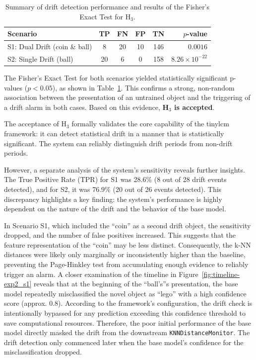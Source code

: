 \begin{table}[htbp]
    \centering
    \caption[Quantitative Drift Detection Results and Hypothesis Test for H$_3$]{Summary of drift detection performance and results of the Fisher's Exact Test for H$_3$.}
    \label{tab:drift_detection_combined_results}
    \footnotesize
    \setlength{\tabcolsep}{4pt}
    \begin{tabularx}{\linewidth}{@{} X c c c c r @{}}
        \toprule
        \textbf{Scenario} & \textbf{TP} & \textbf{FN} & \textbf{FP} & \textbf{TN} & \textbf{$p$-value} \\
        \midrule
        S1: Dual Drift (coin \& ball) & 8 & 20 & 10 & 146 & $0.0016$ \\
        S2: Single Drift (ball) & 20 & 6 & 0 & 158 & $8.26\times10^{-22}$ \\
        \bottomrule
    \end{tabularx}
\end{table}

The Fisher's Exact Test for both scenarios yielded statistically significant p-values ($p < 0.05$), as shown in Table~\ref{tab:drift_detection_combined_results}. This confirms a strong, non-random association between the presentation of an untrained object and the triggering of a drift alarm in both cases. Based on this evidence, \textbf{H$_3$ is accepted}.

The acceptance of H$_3$ formally validates the core capability of the \gls{tinylcm} framework: it can detect statistical drift in a manner that is statistically significant. The system can reliably distinguish drift periods from non-drift periods.

However, a separate analysis of the system's sensitivity reveals further insights. The True Positive Rate (TPR) for S1 was 28.6\% (8 out of 28 drift events detected), and for S2, it was 76.9\% (20 out of 26 events detected). This discrepancy highlights a key finding: the system's performance is highly dependent on the nature of the drift and the behavior of the base model.

In Scenario S1, which included the ``coin'' as a second drift object, the sensitivity dropped, and the number of false positives increased. This suggests that the feature representation of the ``coin'' may be less distinct. Consequently, the k-NN distances were likely only marginally or inconsistently higher than the baseline, preventing the Page-Hinkley test from accumulating enough evidence to reliably trigger an alarm. A closer examination of the timeline in Figure~\ref{fig:timeline-exp2_s1} reveals that at the beginning of the ``ball's''s presentation, the base model repeatedly misclassified the novel object as ``lego'' with a high confidence score (approx. 0.8). According to the framework's configuration, the drift check is intentionally bypassed for any prediction exceeding this confidence threshold to save computational resources. Therefore, the poor initial performance of the base model directly masked the drift from the downstream \texttt{KNNDistanceMonitor}. The drift detection only commenced later when the base model's confidence for the misclassification dropped.


